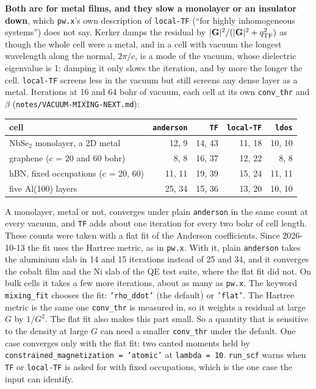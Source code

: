 \documentclass[11pt,a4paper]{article}
\newcommand{\code}[1]{\texttt{\small #1}}
\begin{document}
\textbf{Both are for metal films, and they slow a monolayer or an insulator
down}, which \code{pw.x}'s own description of \code{local-TF} (``for highly
inhomogeneous systems'') does not say. Kerker damps the residual by
$|\mathbf G|^2/(|\mathbf G|^2 + q_{\rm TF}^2)$ as though the whole cell were a metal, and
in a cell with vacuum the longest wavelength along the normal, $2\pi/c$, is a mode of
the vacuum, whose dielectric eigenvalue is 1: damping it only slows the iteration, and
by more the longer the cell. \code{local-TF} screens less in the vacuum but still
screens any dense layer as a metal. Iterations at 16 and 64 bohr of vacuum, each cell
at its own \code{conv\_thr} and $\beta$ (\code{notes/VACUUM-MIXING-NEXT.md}):
\begin{center}
\begin{tabular}{lrrrr}
\toprule
cell & \code{anderson} & \code{TF} & \code{local-TF} & \code{ldos} \\
\midrule
NbSe$_2$ monolayer, a 2D metal & 12, 9 & 14, 43 & 11, 18 & 10, 10 \\
graphene ($c$ = 20 and 60 bohr) & 8, 8 & 16, 37 & 12, 22 & 8, 8 \\
hBN, fixed occupations ($c$ = 20, 60) & 11, 11 & 19, 39 & 15, 24 & 11, 11 \\
five Al(100) layers & 25, 34 & 15, 36 & 13, 20 & 10, 10 \\
\bottomrule
\end{tabular}
\end{center}
A monolayer, metal or not, converges under plain \code{anderson} in the same count at
every vacuum, and \code{TF} adds about one iteration for every two bohr of cell length.
These counts were taken with a flat fit of the Anderson coefficients. Since
2026-10-13 the fit uses the Hartree metric, as in \code{pw.x}. With it, plain
\code{anderson} takes the aluminium slab in 14 and 15 iterations instead of 25 and 34,
and it converges the cobalt film and the Ni slab of the QE test suite, where the
flat fit did not. On bulk cells it takes a few more iterations, about as many as
\code{pw.x}.
The keyword \code{mixing\_fit} chooses the fit: \code{'rho\_ddot'} (the default) or
\code{'flat'}. The Hartree metric is the same one \code{conv\_thr} is measured in,
so it weights a residual at large $G$ by $1/G^2$. The flat fit also makes this part
small. So a quantity that is sensitive to the density at large $G$ can need a smaller
\code{conv\_thr} under the default. One case converges only with the flat fit: two
canted moments held by \code{constrained\_magnetization = 'atomic'} at
\code{lambda = 10}.
\code{run\_scf} warns when \code{TF} or \code{local-TF} is asked for with fixed
occupations, which is the one case the input can identify.
\end{document}
